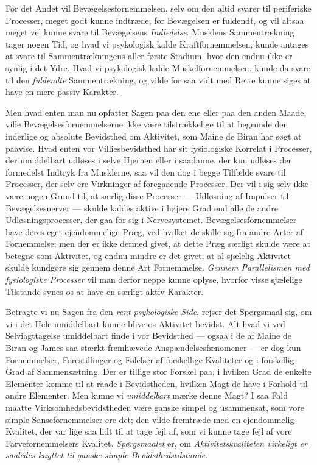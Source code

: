 \documentclass[12pt,a4paper,openany]{book}
\begin{document}
For det Andet vil Bevægelsesfornemmelsen, selv om den altid svarer til
periferiske Processer, meget godt kunne indtræde, før Bevægelsen er fuldendt,
og vil altsaa meget vel kunne svare til Bevægelsens \emph{Indledelse}. Musklens
Sammentrækning tager nogen Tid, og hvad vi psykologisk kalde Kraftfornemmelsen,
kunde antages at svare til Sammentrækningens aller første Stadium, hvor den
endnu ikke er synlig i det Ydre. Hvad vi psykologisk kalde Muskelfornemmelsen,
kunde da svare til den \emph{fuldendte} Sammentrækning, og vilde for saa vidt
med Rette kunne siges at have en mere passiv Karakter.

Men hvad enten man nu opfatter Sagen paa den ene eller paa den anden Maade,
ville Bevægelsesfornemmelserne ikke være tilstrækkelige til at begrunde den
inderlige og absolute Bevidsthed om Aktivitet, som Maine de Biran har søgt at
paavise. Hvad enten vor Villiesbevidsthed har sit fysiologiske Korrelat i
Processer, der umiddelbart udløses i selve Hjernen eller i saadanne, der kun
udløses der formedelst Indtryk fra Musklerne, saa vil den dog i begge Tilfælde
svare til Processer, der selv ere Virkninger af foregaaende Processer. Der vil
i sig selv ikke være nogen Grund til, at særlig disse Processer --- Udløsning
af Impulser til Bevægelsesnerver --- skulde kaldes aktive i højere Grad end
alle de andre Udløsningsprocesser, der gaa for sig i Nervesystemet.
Bevægelsesfornemmelser have deres eget ejendommelige Præg, ved hvilket de
skille sig fra andre Arter af Fornemmelse; men der er ikke dermed givet, at
dette Præg særligt skulde være at betegne som Aktivitet, og endnu mindre er det
givet, at al sjælelig Aktivitet skulde kundgøre sig gennem denne Art
Fornemmelse. \emph{Gennem Parallelismen med fysiologiske Processer} vil man
derfor neppe kunne oplyse, hvorfor visse sjælelige Tilstande synes os at have
en særligt aktiv Karakter.

Betragte vi nu Sagen fra den \emph{rent psykologiske Side}, rejser det
Spørgsmaal sig, om vi i det Hele umiddelbart kunne blive os Aktivitet bevidst.
Alt hvad vi ved Selviagttagelse umiddelbart finde i vor Bevidsthed --- ogsaa i
de af Maine de Biran og James saa stærkt fremhævede Anspændelsesfænomener ---
er dog kun Fornemmelser, Forestillinger og Følelser af forskellige Kvaliteter
og i forskellig Grad af Sammensætning. Der er tillige stor Forskel paa, i
hvilken Grad de enkelte Elementer komme til at raade i Bevidstheden, hvilken
Magt de have i Forhold til andre Elementer. Men kunne vi \emph{umiddelbart}
mærke denne Magt? I saa Fald maatte Virksomhedsbevidstheden være ganske simpel
og usammensat, som vore simple Sansefornemmelser ere det; den vilde fremtræde
med en ejendommelig Kvalitet, der var lige saa lidt til at tage fejl af, som vi
kunne tage fejl af vore Farvefornemmelsers Kvalitet. \emph{Spørgsmaalet} er, om
\emph{Aktivitetskvaliteten virkeligt er saaledes knyttet til ganske simple
Bevidsthedstilstande}.
\end{document}
